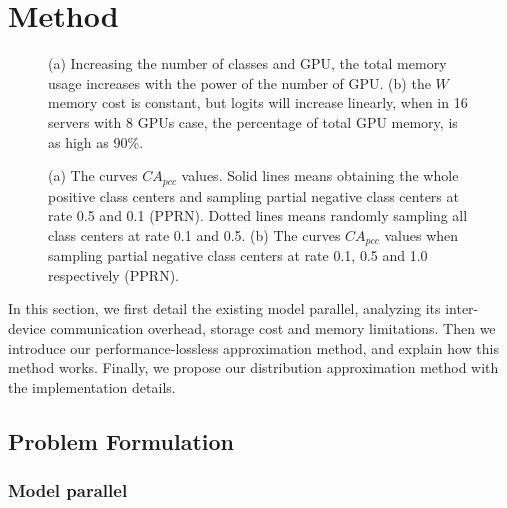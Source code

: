 \documentclass[letterpaper]{article} \usepackage{style/aaai21}  \usepackage{times}  \usepackage{helvet} \usepackage{courier}  \usepackage[hyphens]{url}  \usepackage{graphicx} \usepackage{color}
\begin{document}
\section{Method}


\begin{figure}[t]
	\centering
	\caption{(a) Increasing the number of classes and GPU, the total memory usage increases with the power of the number of GPU. (b) the $W$ memory cost is constant, but logits will increase linearly, when in 16 servers with 8 GPUs case, the percentage of total GPU memory, is as high as 90\%.}
	\label{fig9}
\end{figure}


\begin{figure}[t]
	\centering
 	\caption{(a) The curves $CA_{pcc}$ values. Solid lines means obtaining the whole positive class centers and sampling partial negative class centers at rate 0.5 and 0.1 (PPRN). Dotted lines means randomly sampling all class centers at rate 0.1 and 0.5. (b) The curves $CA_{pcc}$ values when sampling partial negative class centers at rate 0.1, 0.5 and 1.0 respectively (PPRN). }
	\label{PositiveRandomP}
\end{figure}
In this section, we first detail the existing model parallel, analyzing its inter-device communication overhead, storage cost and memory limitations. Then we introduce our performance-lossless approximation method, and explain how this method works. Finally, we propose our distribution approximation method with the implementation details.

\subsection{Problem Formulation}
\subsubsection{Model parallel}
\end{document}
